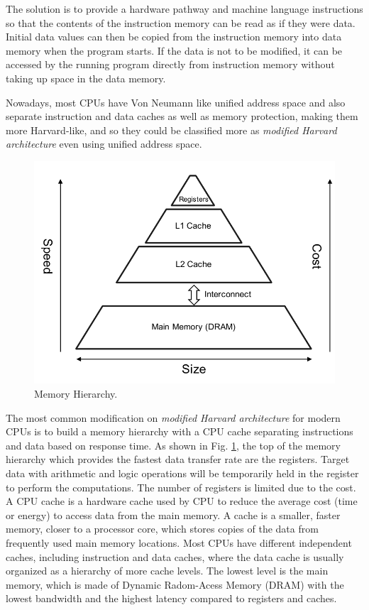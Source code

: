 The solution is to provide a hardware pathway and machine language instructions so that the contents of the instruction memory can be read as if they were data. Initial data values can then be copied from the instruction memory into data memory when the program starts. If the data is not to be modified, it can be accessed by the running program directly from instruction memory without taking up space in the data memory.

Nowadays, most CPUs have Von Neumann like unified address space and also separate instruction and data caches as well as memory protection, making them more Harvard-like, and so they could be classified more as \textit{modified Harvard architecture} even using unified address space.

\begin{figure}[htbp]
	\centering
	\includegraphics[width=0.81\linewidth]{fig/memory.pdf}
	\caption{Memory Hierarchy.}
	\label{fig:memory-access}
\end{figure}

The most common modification on \textit{modified Harvard architecture}  for modern CPUs is to build a memory hierarchy with a CPU cache separating instructions and data based on response time. As shown in Fig. \ref{fig:memory-access}, the top of the memory hierarchy which provides the fastest data transfer rate are the registers. Target data with arithmetic and logic operations will be temporarily held in the register to perform the computations. The number of registers is limited due to the cost. A CPU cache is a hardware cache used by CPU to reduce the average cost (time or energy) to access data from the main memory. A cache is a smaller, faster memory, closer to a processor core, which stores copies of the data from frequently used main memory locations. Most CPUs have different independent caches, including instruction and data caches, where the data cache is usually organized as a hierarchy of more cache levels. The lowest level is the main memory, which is made of Dynamic Radom-Acess Memory (DRAM) with the lowest bandwidth and the highest latency compared to registers and caches.


